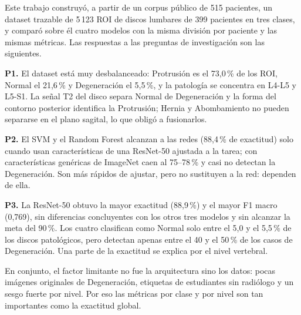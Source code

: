 Este trabajo construyó, a partir de un corpus público de 515 pacientes, un dataset trazable de 5\,123 ROI de discos lumbares de 399 pacientes en tres clases, y comparó sobre él cuatro modelos con la misma división por paciente y las mismas métricas. Las respuestas a las preguntas de investigación son las siguientes.

\textbf{P1.} El dataset está muy desbalanceado: Protrusión es el 73,0\,\% de los ROI, Normal el 21,6\,\% y Degeneración el 5,5\,\%, y la patología se concentra en L4-L5 y L5-S1. La señal T2 del disco separa Normal de Degeneración y la forma del contorno posterior identifica la Protrusión; Hernia y Abombamiento no pueden separarse en el plano sagital, lo que obligó a fusionarlos.

\textbf{P2.} El SVM y el Random Forest alcanzan a las redes (88,4\,\% de exactitud) solo cuando usan características de una ResNet-50 ajustada a la tarea; con características genéricas de ImageNet caen al 75--78\,\% y casi no detectan la Degeneración. Son más rápidos de ajustar, pero no sustituyen a la red: dependen de ella.

\textbf{P3.} La ResNet-50 obtuvo la mayor exactitud (88,9\,\%) y el mayor F1 macro (0,769), sin diferencias concluyentes con los otros tres modelos y sin alcanzar la meta del 90\,\%. Los cuatro clasifican como Normal solo entre el 5,0 y el 5,5\,\% de los discos patológicos, pero detectan apenas entre el 40 y el 50\,\% de los casos de Degeneración. Una parte de la exactitud se explica por el nivel vertebral.

En conjunto, el factor limitante no fue la arquitectura sino los datos: pocas imágenes originales de Degeneración, etiquetas de estudiantes sin radiólogo y un sesgo fuerte por nivel. Por eso las métricas por clase y por nivel son tan importantes como la exactitud global.
